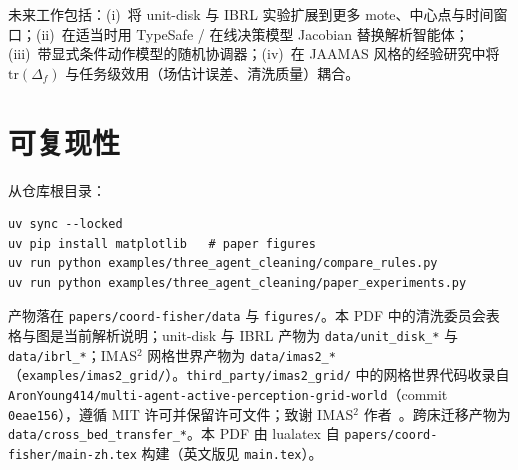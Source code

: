 \documentclass[11pt,a4paper]{article}
\begin{document}
未来工作包括：(i)~将 unit-disk 与 IBRL 实验扩展到更多 mote、中心点与时间窗口；(ii)~在适当时用 TypeSafe / 在线决策模型 Jacobian 替换解析智能体；(iii)~带显式条件动作模型的随机协调器；(iv)~在 JAAMAS 风格的经验研究中将 $\mathrm{tr}(\Delta_f)$ 与任务级效用（场估计误差、清洗质量）耦合。

\section*{可复现性}

从仓库根目录：
\begin{verbatim}
uv sync --locked
uv pip install matplotlib   # paper figures
uv run python examples/three_agent_cleaning/compare_rules.py
uv run python examples/three_agent_cleaning/paper_experiments.py
\end{verbatim}
产物落在 \texttt{papers/coord-fisher/data} 与
\texttt{figures/}。本 PDF 中的清洗委员会表格与图是当前解析说明；unit-disk 与 IBRL 产物为 \texttt{data/unit\_disk\_*} 与 \texttt{data/ibrl\_*}；IMAS$^2$ 网格世界产物为 \texttt{data/imas2\_*}（\texttt{examples/imas2\_grid/}）。\texttt{third\_party/imas2\_grid/} 中的网格世界代码收录自 \texttt{AronYoung414/multi-agent-active-perception-grid-world}（commit \texttt{0eae156}），遵循 MIT 许可并保留许可文件；致谢 IMAS$^2$ 作者~\citep{shi2026imas2}。跨床迁移产物为 \texttt{data/cross\_bed\_transfer\_*}。本 PDF 由 lualatex 自
\texttt{papers/coord-fisher/main-zh.tex} 构建（英文版见 \texttt{main.tex}）。



\end{document}
